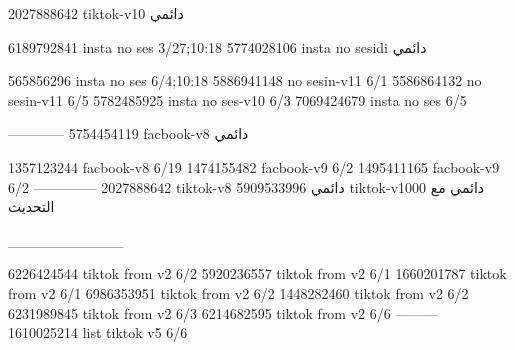 2027888642 tiktok-v10
دائمي

6189792841 insta no ses
3/27;10:18
5774028106 insta no sesidi
دائمي

565856296 insta no ses
6/4;10:18
5886941148 no sesin-v11
6/1
5586864132 no sesin-v11
6/5
5782485925 insta no ses-v10
6/3
7069424679 insta no ses
6/5

------------
5754454119 facbook-v8
دائمي

1357123244 facbook-v8
6/19
1474155482 facbook-v9
6/2
1495411165 facbook-v9
6/2
--------------
2027888642 tiktok-v8
دائمي
5909533996 tiktok-v1000
دائمي مع التحديث

___________

6226424544 tiktok from v2
6/2
5920236557 tiktok from v2
6/1
1660201787 tiktok from v2
6/1
6986353951 tiktok from v2
6/2
1448282460 tiktok from v2
6/2
6231989845 tiktok from v2
6/3
6214682595 tiktok from v2
6/6
---------
1610025214 list tiktok v5
6/6
